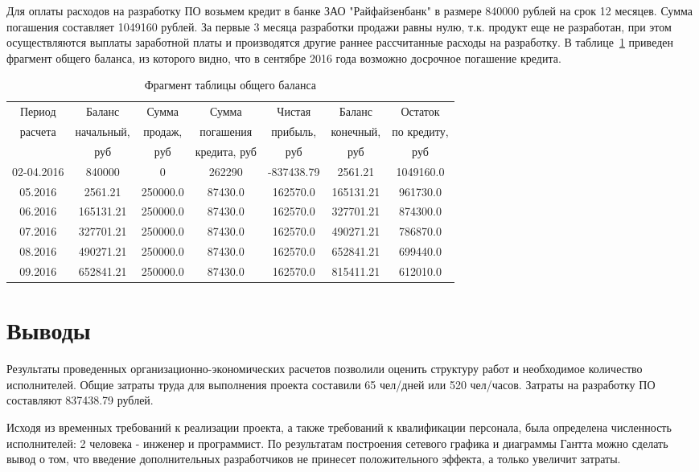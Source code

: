 Для оплаты расходов на разработку ПО возьмем кредит в банке ЗАО "Райфайзенбанк" в размере 840000 рублей на срок 12 месяцев. Сумма погашения составляет 1049160 рублей. За первые 3 месяца разработки продажи равны нулю, т.к. продукт еще не разработан, при этом осуществляются выплаты заработной платы и производятся другие раннее рассчитанные расходы на разработку. В таблице~\ref{table:money_balance} приведен фрагмент общего баланса, из которого видно, что в сентябре 2016 года возможно досрочное погашение кредита.
\begin{table}
\caption{Фрагмент таблицы общего баланса}
\label{table:money_balance}
\begin{tabular} {| c | c | c | c | c | c | c |} 
\hline
Период & Баланс & Сумма & Сумма & Чистая & Баланс & Остаток\\
расчета & начальный, & продаж, & погашения & прибыль, & конечный, & по кредиту,\\
& руб & руб & кредита, руб & руб & руб & руб\\
\hline
02-04.2016 & 840000 & 0 & 262290 & -837438.79 & 2561.21 & 1049160.0\\
\hline
05.2016 & 2561.21 & 250000.0 & 87430.0 & 162570.0 & 165131.21 & 961730.0\\
\hline
06.2016 & 165131.21 & 250000.0 & 87430.0 & 162570.0 & 327701.21 & 874300.0\\
\hline
07.2016 & 327701.21 & 250000.0 & 87430.0 & 162570.0 & 490271.21 & 786870.0\\
\hline
08.2016 & 490271.21 & 250000.0 & 87430.0 & 162570.0 & 652841.21 & 699440.0\\
\hline
09.2016 & 652841.21 & 250000.0 & 87430.0 & 162570.0 & 815411.21 & 612010.0\\
\hline
\end{tabular}
\end{table}


\section{Выводы}
Результаты проведенных организационно-экономических расчетов позволили оценить структуру работ и необходимое количество исполнителей. Общие затраты труда для выполнения проекта составили 65 чел/дней или 520 чел/часов. Затраты на разработку ПО составляют 837438.79 рублей.

Исходя из временных требований к реализации проекта, а также требований к квалификации персонала, была определена численность исполнителей: 2 человека - инженер и программист. По результатам построения сетевого графика и диаграммы Гантта можно сделать вывод о том, что введение дополнительных разработчиков не принесет положительного эффекта, а только увеличит затраты.

